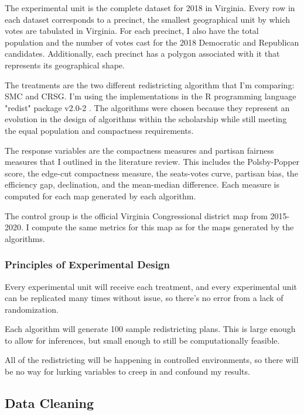The experimental unit is the complete dataset for 2018 in Virginia. Every row in each dataset corresponds to a precinct, the smallest geographical unit by which votes are tabulated in Virginia. For each precinct, I also have the total population and the number of votes cast for the 2018 Democratic and Republican candidates. Additionally, each precinct has a polygon associated with it that represents its geographical shape.

The treatments  are the two different redistricting algorithm that I'm comparing: SMC and CRSG. I'm using the implementations in the R programming language "redist" package v2.0-2 \parencite{fifield2020d}. The algorithms were chosen because they represent an evolution in the design of algorithms within the scholarship while still meeting the equal population and compactness requirements.

The response variables are the compactness measures and partisan fairness measures that I outlined in the literature review. This includes the Polsby-Popper score, the edge-cut compactness measure, the seats-votes curve, partisan bias, the efficiency gap, declination, and the mean-median difference. Each measure is computed for each map generated by each algorithm.

The control group is the official Virginia Congressional district map from 2015-2020. I compute the same metrics for this map as for the maps generated by the algorithms.

\subsubsection{Principles of Experimental Design}

Every experimental unit will receive each treatment, and every experimental unit can be replicated many times without issue, so there’s no error from a lack of randomization. 

Each algorithm will generate 100 sample redistricting plans. This is large enough to allow for inferences, but small enough to still be computationally feasible. 

All of the redistricting will be happening in controlled environments, so there will be no way for lurking variables to creep in and confound my results. 

\subsection{Data Cleaning}

